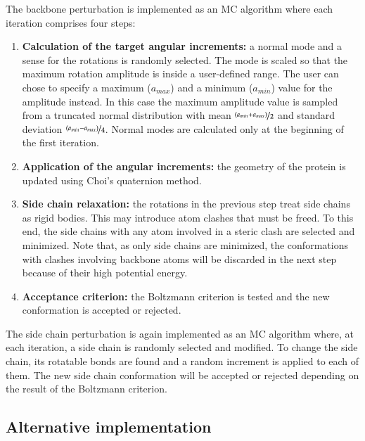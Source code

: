 The backbone perturbation is implemented as an MC algorithm where each iteration comprises four steps:

\begin{enumerate}

\item  \textbf{Calculation of the target angular increments:} a normal mode and a sense for the rotations is randomly selected. The mode is scaled so that the maximum rotation amplitude is inside a user-defined range. The user can chose to specify a maximum ($a_{max}$) and a  minimum ($a_{min}$) value for the amplitude instead. In this case the maximum amplitude value is sampled from a truncated normal distribution with mean $\nicefrac{ (a_{min} + a_{max})}{2}$ and standard deviation $\nicefrac{(a_{min} - a_{max})}{4}$. Normal modes are calculated only at the beginning of the first iteration.

\item \textbf{Application of the angular increments:} the geometry of the protein is updated using Choi's \cite{choi_updating_2006-1} quaternion method.

\item \textbf{Side chain relaxation:} the rotations in the previous step treat side chains as rigid bodies. This may introduce atom clashes that must be freed. To this end, the side chains with any atom involved in a steric clash are selected and minimized. Note that, as only side chains are minimized, the conformations with clashes involving backbone atoms will be discarded in the next step because of their high potential energy. 

\item \textbf{Acceptance criterion:} the Boltzmann criterion is tested and the new conformation is accepted or rejected. 

\end{enumerate}

The side chain perturbation is again implemented as an MC algorithm where, at each iteration, a side chain is randomly selected and modified. To change the side chain, its rotatable bonds are found and a random increment is applied to each of them. The new side chain conformation will be accepted or rejected depending on the result of the Boltzmann criterion.


\subsection{Alternative implementation}

